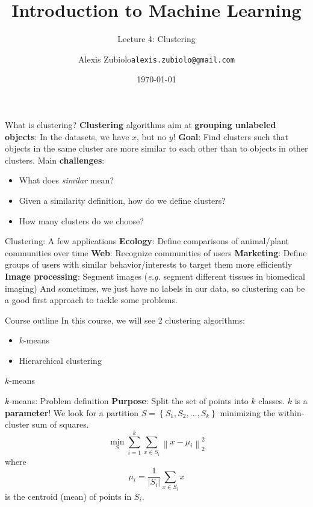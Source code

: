 \documentclass{beamer}
\title[Classification]{Introduction to Machine Learning}
\subtitle{Lecture 4: Clustering}
\author{Alexis Zubiolo\newline\texttt{alexis.zubiolo@gmail.com}}
\institute{Data Science Team Lead @ Adcash}
\date{\today}
\newcommand{\norm}[1]{\left\lVert#1\right\rVert}
\begin{document}
\begin{frame}
  \titlepage
\end{frame}

\begin{frame}{What is clustering?}
\textbf{Clustering} algorithms aim at \textbf{grouping unlabeled objects}: In the datasets, we have $x$, but no $y$!
\vfill
\pause
\textbf{Goal}: Find clusters such that objects in the same cluster are more similar to each other than to objects in other clusters.
\pause
\vfill
Main \textbf{challenges}:
\begin{itemize}
	\item What does \textit{similar} mean?
	\item Given a similarity definition, how do we define clusters?
	\item How many clusters do we choose?
\end{itemize}
\end{frame}

\begin{frame}{Clustering: A few applications}
\textbf{Ecology}: Define comparisons of animal/plant communities over time
\vfill
\textbf{Web}: Recognize communities of users
\vfill
\textbf{Marketing}: Define groups of users with similar behavior/interests to target them more efficiently
\vfill
\textbf{Image processing}: Segment images (\textit{e.g.} segment different tissues in biomedical imaging)
\vfill
And sometimes, we just have no labels in our data, so clustering can be a good first approach to tackle some problems.
\end{frame}

\begin{frame}{Course outline}
In this course, we will see 2 clustering algorithms:
\pause
\begin{itemize}
	\item $k$-means
	\item Hierarchical clustering
\end{itemize}
\end{frame}

\begin{frame}
	\center \Huge{$k$-means}
\end{frame}

\begin{frame}{$k$-means: Problem definition}
\textbf{Purpose}: Split the set of points into $k$ classes. $k$ is a \textbf{parameter}!
\pause
\vfill
We look for a partition $S = \left\{ S_1, S_2, \dots, S_k\right\}$ minimizing the within-cluster sum of squares.
\begin{equation*}
\min_S \sum_{i = 1}^{k} \sum_{x \in S_i} \norm{x - \mu_i}_2^2
\end{equation*}
where 
\begin{equation*}
\mu_i = \dfrac{1}{|S_i|} \sum_{x \in S_i} x
\end{equation*}
is the centroid (mean) of points in $S_i$.
\end{frame}
\end{document}
